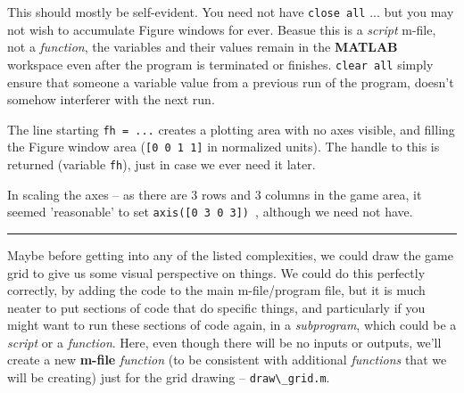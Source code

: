\documentclass{tufte-book} %
\begin{document}
This should mostly be self-evident. You need  not have \texttt{close \textcolor[rgb]{1,0,1}{all}} ... but you may not wish to accumulate \textsf{Figure windows} for ever. Beasue this is a \textit{script} \textsf{m-file}, not a \textit{function}, the variables and their values remain in the \textbf{MATLAB} workspace even after the program is terminated or finishes. \texttt{clear all} simply ensure that someone a variable value from a previous run of the program, doesn't somehow interferer with the next run.

The line starting \texttt{fh = ...} creates a plotting area with no axes visible, and filling the Figure window area (\texttt{[0 0 1 1]} in normalized units). The handle to this is returned (variable \texttt{fh}), just in case we ever need it later.

In scaling the axes -- as there are 3 rows and 3 columns in the game area, it seemed 'reasonable' to set \texttt{axis([0 3 0 3]) }, although we need not have.

\vspace{1mm}
\noindent\rule{4cm}{0.5pt}
\vspace{2mm}

\noindent Maybe before getting into any of the listed complexities, we could draw the game grid to give us some visual perspective on things. We could do this perfectly correctly, by adding the code to the main \textsf{m-file}/program file, but it is much neater to put sections of code that do specific things, and particularly if you might want to run these sections of code again, in a \textit{subprogram}, which could be a \textit{script} or a \textit{function}. Here, even though there will be no inputs or outputs, we'll create a new \textbf{m-file }\textit{function} (to be consistent with additional \textit{functions} that we will be creating) just for the grid drawing -- \texttt{draw\textbackslash\_grid.m}.
\end{document}
